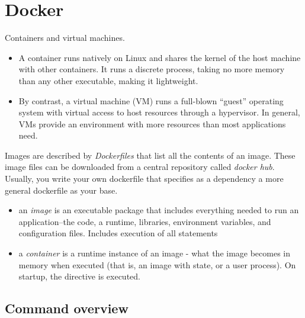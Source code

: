 \section{Docker}

Containers and virtual machines.
\begin{itemize}
    \item A container runs natively on Linux and shares the kernel of the host machine with other containers. It runs a discrete process, taking no more memory than any other executable, making it lightweight.
    \item By contrast, a virtual machine (VM) runs a full-blown “guest” operating system with virtual access to host resources through a hypervisor. In general, VMs provide an environment with more resources than most applications need.
\end{itemize}

Images are described by \emph{Dockerfiles} that list all the contents of an image. These image files can be downloaded from a central repository called \emph{docker hub}.
Usually, you write your own dockerfile that specifies as a dependency a more general dockerfile as your base. 
\begin{itemize}
    \item an \emph{image} is an executable package that includes everything needed to run an application--the code, a runtime, libraries, environment variables, and configuration files. Includes execution of all  statements
    \item a \emph{container} is a runtime instance of an image - what the image becomes in memory when executed (that is, an image with state, or a user process). On startup, the  directive is executed.
\end{itemize}


\subsection{Command overview}

